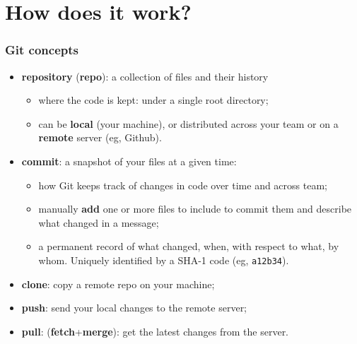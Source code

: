 \documentclass[10pt,svgnames]{beamer}
\begin{document}
\section{How does it work?}

\begin{frame}
\frametitle{Git concepts}
    
\begin{itemize}[<+->]
\item \textbf{repository} (\textbf{repo}): a collection of files and their history
\begin{itemize}
   \item where the code is kept: under a single root directory;
   \item can be \textbf{local} (your machine), or distributed across your team or on a \textbf{remote} server (eg, Github).
 \end{itemize}

\item \textbf{commit}: a snapshot of your files at a given time:
\begin{itemize}
  \item how Git keeps track of changes in code over time and across team;
  \item manually \textbf{add} one or more files to include to commit them and describe what changed in a message;
  \item a permanent record of what changed, when, with respect to what, by whom. Uniquely identified by a SHA-1 code (eg, \texttt{a12b34}).
\end{itemize}

\item \textbf{clone}: copy a remote repo on your machine;
\item \textbf{push}: send your local changes to the remote server;
\item \textbf{pull}: (\textbf{fetch}+\textbf{merge}): get the latest changes from the server.
\end{itemize}

\end{frame}





\end{document}
